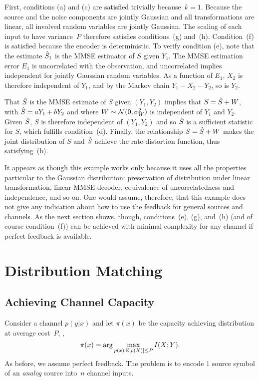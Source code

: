 First, conditions (a) and (c) are satisfied trivially because~$k=1$. Because the
source and the noise components are jointly Gaussian and all transformations are
linear, all involved random variables are jointly Gaussian. The scaling of each
input to have variance~$P$ therefore satisfies conditions~(g) and~(h).
Condition~(f) is satisfied because the encoder is deterministic. To verify
condition (e), note that the estimate ${\hat{S}}_1$ is the MMSE estimator of $S$ given
$Y_1$. The MMSE estimation error $E_1$ is uncorrelated with the observation, and
uncorrelated implies independent for jointly Gaussian random variables. As a
function of $E_1$, $X_2$ is therefore independent of $Y_1$, and by the Markov
chain $Y_1 - X_2 - Y_2$, so is $Y_2$.

That ${\hat{S}}$ is the MMSE estimate of $S$ given $(Y_1, Y_2)$ implies that $S = {\hat{S}}
+ W$, with ${\hat{S}} = a Y_1 + b Y_2$ and where $W \sim \mathcal{N}(0, \sigma_W^2)$ is
independent of $Y_1$ and $Y_2$. Given ${\hat{S}}$, $S$ is therefore independent of
$(Y_1, Y_2)$ and so ${\hat{S}}$ is a sufficient statistic for $S$, which fulfills
condition~(d). Finally, the relationship $S = {\hat{S}} + W$ makes the joint
distribution of $S$ and ${\hat{S}}$ achieve the rate-distortion function, thus
satisfying~(b).

It appears as though this example works only because it uses all the properties
particular to the Gaussian distribution: preservation of distribution under
linear transformation, linear MMSE decoder, equivalence of uncorrelatedness and
independence, and so on. One would assume, therefore, that this example does not
give any indication about how to use the feedback for general sources and
channels. As the next section shows, though, conditions~(e), (g), and~(h) (and
of course condition~(f)) can be achieved with minimal complexity for any channel
if perfect feedback is available.


\section{Distribution Matching}

\subsection{Achieving Channel Capacity}

Consider a channel $p(y|x)$ and let $\pi(x)$ be the capacity achieving
distribution at average cost~$P$, \ie, 
\begin{equation*}
  \pi(x) = \arg\max_{p(x): \mathbb{E}[\rho(X)] \le P} I(X;Y).
\end{equation*}
As before, we assume perfect feedback. The problem is to encode $1$ source
symbol of an \emph{analog} source into~$n$ channel inputs. 

